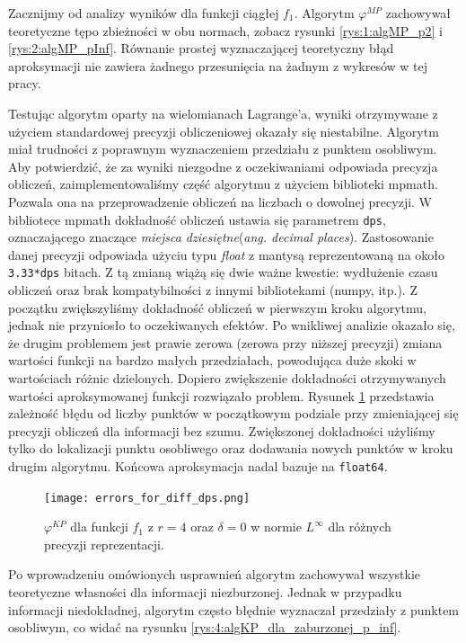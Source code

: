 \documentclass[oik, pdftex, man]{mgrwms}
\begin{document}
    Zacznijmy od analizy wyników dla funkcji ciągłej $f_{1}$. Algorytm $\varphi^{MP}$ zachowywał teoretyczne tępo zbieżności w obu normach, zobacz rysunki \ref{rys:1:algMP_p2} i \ref{rys:2:algMP_pInf}. Równanie prostej wyznaczającej teoretyczny błąd aproksymacji nie zawiera żadnego przesunięcia na żadnym z wykresów w tej pracy.

    Testując algorytm oparty na wielomianach Lagrange'a, wyniki otrzymywane z użyciem standardowej precyzji obliczeniowej okazały się niestabilne. Algorytm miał trudności z poprawnym wyznaczeniem przedziału z punktem osobliwym.
    Aby potwierdzić, że za wyniki niezgodne z oczekiwaniami odpowiada precyzja obliczeń, zaimplementowaliśmy część algorytmu z użyciem biblioteki mpmath. Pozwala ona na przeprowadzenie obliczeń na liczbach o dowolnej precyzji. W bibliotece mpmath dokładność obliczeń ustawia się parametrem \verb+dps+, oznaczającego znaczące \textit{miejsca dziesiętne}(\textit{ang. decimal places}). Zastosowanie danej precyzji odpowiada użyciu typu \textit{float} z mantysą reprezentowaną na około \verb+3.33*dps+ bitach. Z tą zmianą wiążą się dwie ważne kwestie: wydłużenie czasu obliczeń oraz brak kompatybilności z innymi bibliotekami (numpy, itp.).
    Z początku zwiększyliśmy dokładność obliczeń w pierwszym kroku algorytmu, jednak nie przyniosło to oczekiwanych efektów. Po wnikliwej analizie okazało się, że drugim problemem jest prawie zerowa (zerowa przy niższej precyzji) zmiana wartości funkcji na bardzo małych przedziałach, powodująca duże skoki w wartościach różnic dzielonych. Dopiero zwiększenie dokładności otrzymywanych wartości aproksymowanej funkcji rozwiązało problem. Rysunek \ref{rys:3:diff_dps} przedstawia zależność błędu od liczby punktów w początkowym podziale przy zmieniającej się precyzji obliczeń dla informacji bez szumu. Zwiększonej dokładności użyliśmy tylko do lokalizacji punktu osobliwego oraz dodawania nowych punktów w kroku drugim algorytmu. Końcowa aproksymacja nadal bazuje na \verb+float64+.
    \begin{figure}
        \centering
        \texttt{[image: errors\_for\_diff\_dps.png]}
        \caption{$\varphi^{KP}$ dla funkcji $f_{1}$ z $r = 4$ oraz $\delta = 0$ w normie $L^{\infty}$ dla różnych precyzji reprezentacji.}
        \label{rys:3:diff_dps}
    \end{figure}
    Po wprowadzeniu omówionych usprawnień algorytm zachowywał wszystkie teoretyczne własności dla informacji niezburzonej. Jednak w przypadku informacji niedokładnej, algorytm często błędnie wyznaczał przedziały z punktem osobliwym, co widać na rysunku \ref{rys:4:algKP_dla_zaburzonej_p_inf}.
\end{document}
